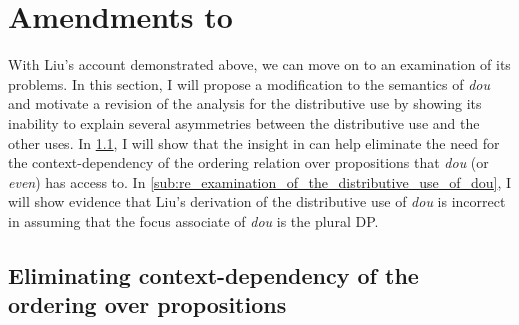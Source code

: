 \documentclass[12pt]{article}
\DeclareMathOperator{\xh}{\textsc{Exh}}
\newcommand{\exh}{\ensuremath{\xh}}
\begin{document}


\section[Amendments to Liu]{Amendments to \citet{liuVarietiesAlternativesMandarin2017,liuPragmaticExplanationMeidou2021}}
\label{sec:amendments_to_liu}

With Liu's account demonstrated above, we can move on to an examination of its problems. 
In this section, I will propose a modification to the semantics of \emph{dou} and motivate a revision of the analysis for the distributive use by showing its inability to explain several asymmetries between the distributive use and the other uses.
In \cref{sub:eliminating_context_dependency_of_the_ordering_over_propositions}, I will show that the insight in \citet{crnicNonmonotonicityNPILicensing2014} can help eliminate the need for the context-dependency of the ordering relation over propositions that \emph{dou} (or \emph{even}) has access to.
In \cref{sub:re_examination_of_the_distributive_use_of_dou}, I will show evidence that Liu's derivation of the distributive use of \emph{dou} is incorrect in assuming that the focus associate of \emph{dou} is the plural DP.

\subsection{Eliminating context-dependency of the ordering over propositions}
\label{sub:eliminating_context_dependency_of_the_ordering_over_propositions}
\end{document}
